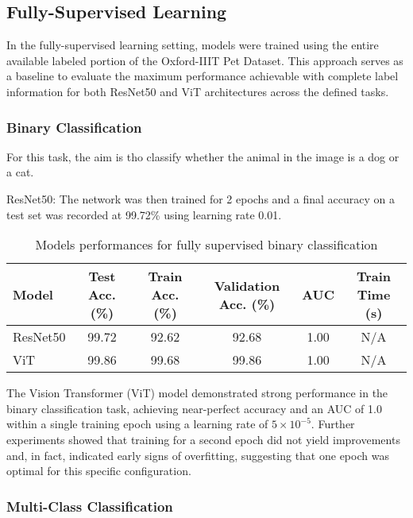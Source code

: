 \documentclass{article}
\begin{document}
\subsection{Fully-Supervised Learning}
In the fully-supervised learning setting, models were trained using the entire available labeled portion of the Oxford-IIIT Pet Dataset. This approach serves as a baseline to evaluate the maximum performance achievable with complete label information for both ResNet50 and ViT architectures across the defined tasks.

\subsubsection{Binary Classification}
For this task, the aim is tho classify whether the animal in the image is a dog or a cat.

ResNet50:  The network was then trained for 2 epochs and a final accuracy on a test set was recorded at 99.72\% using learning rate 0.01. 

\renewcommand{\arraystretch}{1.2} 
\begin{table}[h!] %
    \centering %
    \caption{Models performances for fully supervised binary classification} %
    \label{tab:fully_binary_perf} %
    \begin{tabular}{|l|c|c|c|c|c|}
        \hline
        Model & Test Acc. (\%) & Train Acc. (\%) & Validation Acc. (\%) & AUC & Train Time (s) \\
        \hline
        ResNet50 & 99.72 & 92.62 & 92.68 & 1.00 & N/A \\
        ViT & 99.86 & 99.68 & 99.86 & 1.00 & N/A \\
        \hline
    \end{tabular}
\end{table}

The Vision Transformer (ViT) model demonstrated strong performance in the binary classification task, achieving near-perfect accuracy and an AUC of 1.0 within a single training epoch using a learning rate of \(5 \times 10^{-5}\). Further experiments showed that training for a second epoch did not yield improvements and, in fact, indicated early signs of overfitting, suggesting that one epoch was optimal for this specific configuration.

\subsubsection{Multi-Class Classification}
\end{document}
